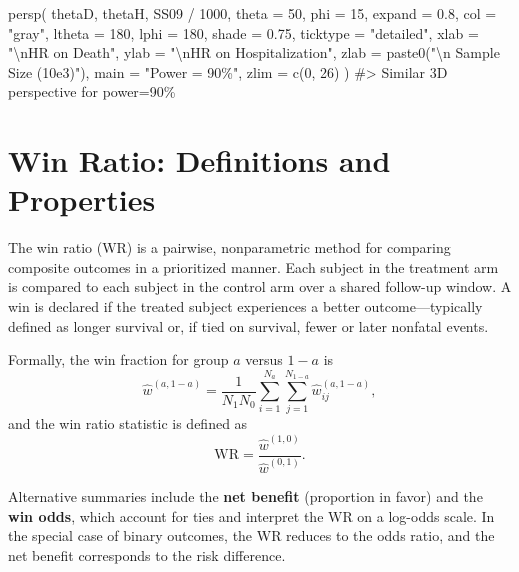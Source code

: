 \documentclass[
  letterpaper,
  DIV=11,
  numbers=noendperiod]{scrreprt}
\newenvironment{Shaded}{\begin{snugshade}}{\end{snugshade}}
\newcommand{\AttributeTok}[1]{\textcolor[rgb]{0.40,0.45,0.13}{#1}}
\newcommand{\CommentTok}[1]{\textcolor[rgb]{0.37,0.37,0.37}{#1}}
\newcommand{\DecValTok}[1]{\textcolor[rgb]{0.68,0.00,0.00}{#1}}
\newcommand{\FloatTok}[1]{\textcolor[rgb]{0.68,0.00,0.00}{#1}}
\newcommand{\FunctionTok}[1]{\textcolor[rgb]{0.28,0.35,0.67}{#1}}
\newcommand{\NormalTok}[1]{\textcolor[rgb]{0.00,0.23,0.31}{#1}}
\newcommand{\SpecialCharTok}[1]{\textcolor[rgb]{0.37,0.37,0.37}{#1}}
\newcommand{\StringTok}[1]{\textcolor[rgb]{0.13,0.47,0.30}{#1}}
\begin{document}
\begin{Shaded}
\begin{Highlighting}[]
\FunctionTok{persp}\NormalTok{(}
\NormalTok{  thetaD, thetaH, SS09 }\SpecialCharTok{/} \DecValTok{1000}\NormalTok{,}
  \AttributeTok{theta =} \DecValTok{50}\NormalTok{, }\AttributeTok{phi =} \DecValTok{15}\NormalTok{, }\AttributeTok{expand =} \FloatTok{0.8}\NormalTok{, }\AttributeTok{col =} \StringTok{"gray"}\NormalTok{,}
  \AttributeTok{ltheta =} \DecValTok{180}\NormalTok{, }\AttributeTok{lphi =} \DecValTok{180}\NormalTok{, }\AttributeTok{shade =} \FloatTok{0.75}\NormalTok{,}
  \AttributeTok{ticktype =} \StringTok{"detailed"}\NormalTok{,}
  \AttributeTok{xlab =} \StringTok{"}\SpecialCharTok{\textbackslash{}n}\StringTok{HR on Death"}\NormalTok{, }\AttributeTok{ylab =} \StringTok{"}\SpecialCharTok{\textbackslash{}n}\StringTok{HR on Hospitalization"}\NormalTok{,}
  \AttributeTok{zlab =} \FunctionTok{paste0}\NormalTok{(}\StringTok{"}\SpecialCharTok{\textbackslash{}n}\StringTok{ Sample Size (10e3)"}\NormalTok{),}
  \AttributeTok{main =} \StringTok{"Power = 90\%"}\NormalTok{,}
  \AttributeTok{zlim =} \FunctionTok{c}\NormalTok{(}\DecValTok{0}\NormalTok{, }\DecValTok{26}\NormalTok{)}
\NormalTok{)}
\CommentTok{\#\textgreater{} Similar 3D perspective for power=90\%}
\end{Highlighting}
\end{Shaded}

\section{Win Ratio: Definitions and
Properties}\label{win-ratio-definitions-and-properties}

The win ratio (WR) is a pairwise, nonparametric method for comparing
composite outcomes in a prioritized manner. Each subject in the
treatment arm is compared to each subject in the control arm over a
shared follow-up window. A win is declared if the treated subject
experiences a better outcome---typically defined as longer survival or,
if tied on survival, fewer or later nonfatal events.

Formally, the win fraction for group \(a\) versus \(1-a\) is \[
\hat w^{(a, 1-a)} = \frac{1}{N_1N_0} \sum_{i=1}^{N_a} \sum_{j=1}^{N_{1-a}} \hat w^{(a, 1-a)}_{ij},
\] and the win ratio statistic is defined as \[
\text{WR} = \frac{\hat w^{(1, 0)}}{\hat w^{(0, 1)}}.
\]

Alternative summaries include the \textbf{net benefit} (proportion in
favor) and the \textbf{win odds}, which account for ties and interpret
the WR on a log-odds scale. In the special case of binary outcomes, the
WR reduces to the odds ratio, and the net benefit corresponds to the
risk difference.
\end{document}
